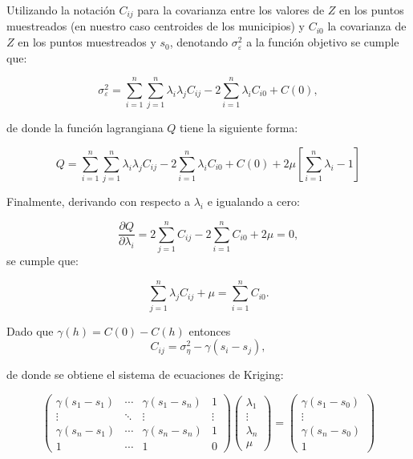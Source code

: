 \documentclass[11pt, oneside]{book}
\begin{document}
Utilizando la notación $C_{ij}$ para la covarianza entre los valores de $Z$ en los puntos muestreados (en nuestro caso centroides de los municipios) y $C_{i0}$ la covarianza de $Z$ en los puntos muestreados y $s_0$, denotando $\sigma_{\varepsilon}^2$ a la función objetivo se cumple que: 

$$\sigma_{\varepsilon}^2 = \sum_{i=1}^n\sum_{j=1}^n\lambda_i\lambda_jC_{ij}-2\sum_{i=1}^n\lambda_iC_{i0} + C(0),$$

\noindent de donde la función lagrangiana $Q$ tiene la siguiente forma:

$$Q=\sum_{i=1}^n\sum_{j=1}^n\lambda_i\lambda_jC_{ij}-2\sum_{i=1}^n\lambda_iC_{i0} + C(0) + 2\mu \left[ \sum_{i=1}^n \lambda_i - 1\right]$$

\bigskip

Finalmente, derivando con respecto a $\lambda_i$ e igualando a cero:

$$\frac{\partial Q}{\partial \lambda_i} = 2\sum_{j=1}^nC_{ij}-2\sum_{i=1}^nC_{i0}+2\mu=0,$$
\noindent se cumple que:

$$\sum_{j=1}^n\lambda_jC_{ij}+\mu = \sum_{i=1}^nC_{i0}.$$

\bigskip

Dado que $\gamma(h)=C(0)-C(h)$ entonces $$C_{ij}=\sigma_{\eta}^2-\gamma(s_i-s_j),$$ 

\noindent de donde se obtiene el sistema de ecuaciones de Kriging:

  \begin{displaymath} 
  \begin{pmatrix} 
	  \gamma(s_1-s_1) & \cdots & \gamma(s_1-s_n) & 1   \\ 
	  \vdots          & \ddots & \vdots          & \vdots   \\ 
	  \gamma(s_n-s_1) & \cdots & \gamma(s_n-s_n) & 1   \\ 
	  1               & \cdots & 1               & 0   	  
	\end{pmatrix}
	\begin{pmatrix} 
	  \lambda_1   \\ 
	  \vdots \\ 
	  \lambda_n \\
	  \mu
	\end{pmatrix}
  =
  \begin{pmatrix} 
	  \gamma(s_1-s_0)  \\ 
	  \vdots \\ 
	  \gamma(s_n-s_0) \\
	  1
	\end{pmatrix}
\end{displaymath}
\end{document}
